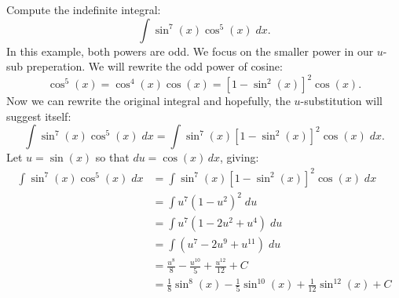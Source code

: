 \documentclass{ximera}
\begin{document}



\begin{example}[example 3]
Compute the indefinite integral:
\[
\int \sin^7(x)\cos^5(x) \; dx.
\]
In this example, both powers are odd.  We focus on the smaller power in our $u$-sub preperation.
We will rewrite the odd power of cosine:
\[
\cos^5(x) = \cos^4(x) \cos(x) = \left[1-\sin^2(x)\right]^2 \cos(x).
\]
Now we can rewrite the original integral and hopefully, the $u$-substitution will suggest itself:
\[
\int \sin^7(x)\cos^5(x) \; dx = \int \sin^7(x)\left[1 - \sin^2(x)\right]^2 \cos(x) \; dx.
\]
Let $u = \sin(x)$ so that $du = \cos(x) \, dx$, giving:
\begin{align*}
\int \sin^7(x)\cos^5(x) \; dx &= \int \sin^7(x)\left[1 - \sin^2(x)\right]^2 \cos(x) \; dx\\
   &= \int u^7 (1-u^2)^2 \; du\\
   &= \int u^7(1 - 2u^2 + u^4) \; du\\
   &= \int (u^7 - 2u^9 + u^{11}) \; du\\
  &= \frac{u^8}{8} - \frac{u^{10}}{5} + \frac{u^{12}}{12}+ C \\
  &= \frac18 \sin^8(x) - \frac15 \sin^{10}(x) + \frac{1}{12} \sin^{12}(x)+ C
\end{align*}

\end{example}
\end{document}
